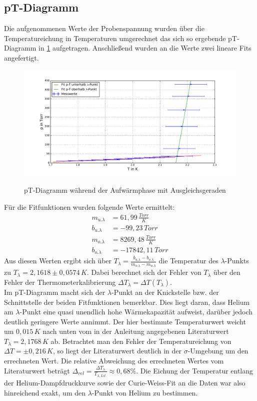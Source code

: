 \documentclass[twoside,colorback,accentcolor=tud4c,11pt]{tudreport}
\begin{document}
\subsection{pT-Diagramm}
Die aufgenommenen Werte der Probenspannung wurden über die Temperatureichung in Temperaturen umgerechnet das sich so ergebende pT-Diagramm in \ref{pTdia} aufgetragen. Anschließend wurden an die Werte zwei lineare Fits angefertigt.
\begin{figure}[H]
\centering
   	\begin{minipage}[b]{1.0\textwidth}
   	\includegraphics[width=\textwidth]{graphics/pT.pdf}
  	\label{pTdia}
   	\end{minipage}
\caption{pT-Diagramm während der Aufwärmphase mit Ausgleichsgeraden}	
\end{figure}
Für die Fitfunktionen wurden folgende Werte ermittelt:
\begin{align}
m_{u.\lambda}&=61,99\,\si{\frac{Torr}{K}}\\
b_{u.\lambda}&=-99,23\,\si{Torr}\\
m_{o.\lambda}&=8269,48\,\si{\frac{Torr}{K}}\\
b_{o.\lambda}&=-17842,11\,\si{Torr}
\end{align}
Aus diesen Werten ergibt sich über $T_{\lambda}=\frac{b_{u.\lambda}-b_{o.\lambda}}{m_{o.\lambda}-m_{u.\lambda}}$ die Temperatur des $\lambda$-Punkts zu ${T_{\lambda}=2,1618\pm 0,0574\,\si{K}}$.
Dabei berechnet sich der Fehler von $T_\lambda$ über den Fehler der Thermometerkalibrierung $\Delta T_\lambda=\Delta T(T_\lambda)$.\\
Im pT-Diagramm macht sich der $\lambda$-Punkt an der Knickstelle bzw. der Schnittstelle der beiden Fitfunktionen bemerkbar. Dies liegt daran, dass Helium am $\lambda$-Punkt eine quasi unendlich hohe Wärmekapazität aufweist, darüber jedoch deutlich geringere Werte annimmt. Der hier bestimmte Temperaturwert  weicht um $0,015\,\si{K}$ nach unten vom in der Anleitung angegebenen Literaturwert ${T_{\lambda}=2,1768\,\si{K}}$ ab. Betrachtet man den Fehler der Temperatureichung von $\Delta T=\pm 0,216\,\si{K}$, so liegt der Literaturwert deutlich in der $\sigma$-Umgebung um den errechneten Wert. Die relative Abweichung des errechneten Wertes vom Literaturwert beträgt $\Delta_{rel}=\frac{\Delta T_{\lambda}}{T_{\lambda ,Lit.}}\approx 0,68\%.$ Die Eichung der Temperatur entlang der Helium-Dampfdruckkurve sowie der Curie-Weiss-Fit an die Daten war also hinreichend exakt, um den $\lambda$-Punkt von Helium zu bestimmen.
\end{document}
